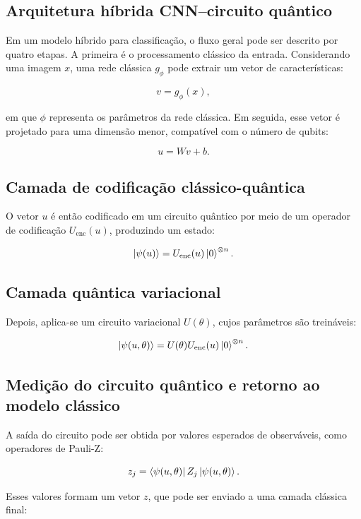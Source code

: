 \documentclass[
    12pt,
    openright,
    oneside,
    a4paper,
    english,
    brazil
]{abntex2}
\begin{document}
\subsection{Arquitetura híbrida CNN--circuito quântico}

Em um modelo híbrido para classificação, o fluxo geral pode ser descrito por quatro etapas. A primeira é o processamento clássico da entrada. Considerando uma imagem \(x\), uma rede clássica \(g_{\phi}\) pode extrair um vetor de características:

\[
v = g_{\phi}(x),
\]

em que \(\phi\) representa os parâmetros da rede clássica. Em seguida, esse vetor é projetado para uma dimensão menor, compatível com o número de qubits:

\[
u = Wv + b.
\]

\subsection{Camada de codificação clássico-quântica}
\label{subsec:camada_codificacao_classico_quantica}

O vetor \(u\) é então codificado em um circuito quântico por meio de um operador de codificação \(U_{\text{enc}}(u)\), produzindo um estado:

\[
\ket{\psi(u)}
=
U_{\text{enc}}(u)
\ket{0}^{\otimes n}.
\]

\subsection{Camada quântica variacional}
\label{subsec:camada_quantica_variacional}

Depois, aplica-se um circuito variacional \(U(\theta)\), cujos parâmetros são treináveis:

\[
\ket{\psi(u,\theta)}
=
U(\theta)
U_{\text{enc}}(u)
\ket{0}^{\otimes n}.
\]

\subsection{Medição do circuito quântico e retorno ao modelo clássico}
\label{subsec:medicao_retorno_modelo_classico}

A saída do circuito pode ser obtida por valores esperados de observáveis, como operadores de Pauli-Z:

\[
z_j =
\bra{\psi(u,\theta)}
Z_j
\ket{\psi(u,\theta)}.
\]

Esses valores formam um vetor \(z\), que pode ser enviado a uma camada clássica final:
\end{document}
